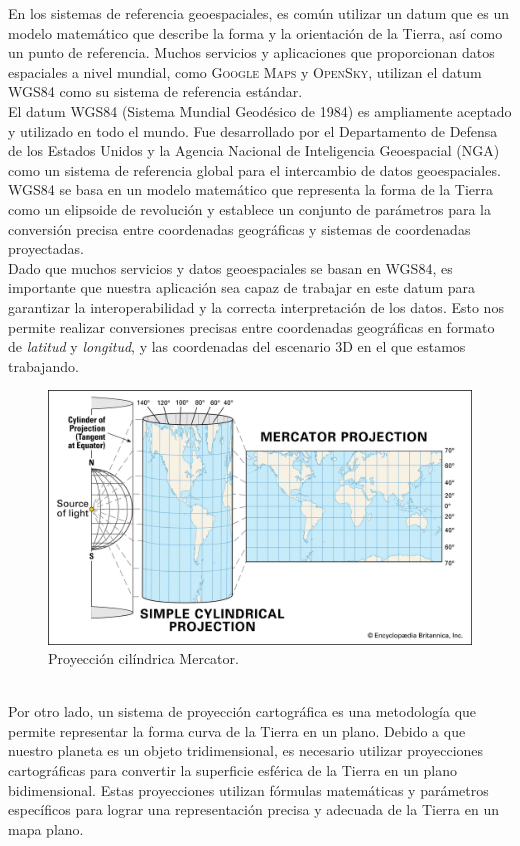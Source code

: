 \documentclass[a4paper, 11pt]{book}
\begin{document}
En los sistemas de referencia geoespaciales, es común utilizar un datum que es un modelo matemático que describe la forma y la orientación de la Tierra, así como un punto de referencia. Muchos servicios y aplicaciones que proporcionan datos espaciales a nivel mundial, como \textsc{Google Maps} y \textsc{OpenSky}, utilizan el datum \textsc{WGS84} como su sistema de referencia estándar.\\
El datum \textsc{WGS84} (Sistema Mundial Geodésico de 1984) es ampliamente aceptado y utilizado en todo el mundo. Fue desarrollado por el Departamento de Defensa de los Estados Unidos y la Agencia Nacional de Inteligencia Geoespacial (\textsc{NGA}) como un sistema de referencia global para el intercambio de datos geoespaciales.\\
\textsc{WGS84} se basa en un modelo matemático que representa la forma de la Tierra como un elipsoide de revolución y establece un conjunto de parámetros para la conversión precisa entre coordenadas geográficas y sistemas de coordenadas proyectadas.\\
Dado que muchos servicios y datos geoespaciales se basan en \textsc{WGS84}, es importante que nuestra aplicación sea capaz de trabajar en este datum para garantizar la interoperabilidad y la correcta interpretación de los datos. Esto nos permite realizar conversiones precisas entre coordenadas geográficas en formato de \emph{latitud} y \emph{longitud}, y las coordenadas del escenario \textsc{3D} en el que estamos trabajando.
\begin{figure}[h]
	\centering
	\includegraphics[width=12cm, keepaspectratio]{img/simple-cylindrical-projection-earth-map-globe-mercator.jpg}
	\caption{Proyección cilíndrica Mercator.}
	\label{fig:mercator}
\end{figure}
\\Por otro lado, un sistema de proyección cartográfica es una metodología que permite representar la forma curva de la Tierra en un plano. Debido a que nuestro planeta es un objeto tridimensional, es necesario utilizar proyecciones cartográficas para convertir la superficie esférica de la Tierra en un plano bidimensional. Estas proyecciones utilizan fórmulas matemáticas y parámetros específicos para lograr una representación precisa y adecuada de la Tierra en un mapa plano.\\
\end{document}
